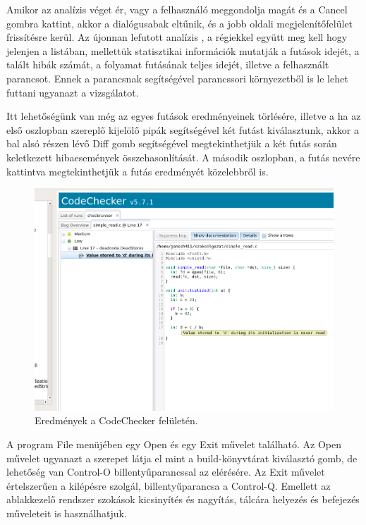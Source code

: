 \documentclass[a4paper,12pt]{report}
\begin{document}
Amikor az analízis véget ér, vagy a felhasználó meggondolja magát és a Cancel gombra kattint, akkor a dialógusabak eltűnik, és a jobb oldali megjelenítőfelület frissítésre kerül. Az újonnan lefutott analízis , a régiekkel együtt meg kell hogy jelenjen a listában, mellettük statisztikai információk mutatják a futások idejét, a talált hibák számát, a folyamat futásának teljes idejét, illetve a felhasznált parancsot. Ennek a parancsnak segítségével parancssori környezetből is le lehet futtani ugyanazt a vizsgálatot.

Itt lehetőségünk van még az egyes futások eredményeinek törlésére, illetve a ha az első oszlopban szereplő kijelölő pipák segítségével két futást kiválasztunk, akkor a bal alsó részen lévő Diff gomb segítségével megtekinthetjük a két futás során keletkezett hibaesemények összehasonlítását. A második oszlopban, a futás nevére kattintva megtekinthetjük a futás eredményét közelebbről is.

\begin{figure}[h]
\caption{Eredmények a CodeChecker felületén.}
\centering
\includegraphics[scale=0.4]{ui_results_open.png}
\end{figure}

A program File menüjében egy Open és egy Exit művelet található. Az Open művelet ugyanazt a szerepet látja el mint a build-könyvtárat kiválasztó gomb, de lehetőség van Control-O billentyűparancssal az elérésére. Az Exit művelet értelszerűen a kilépésre szolgál, billentyűparancsa a Control-Q. Emellett az ablakkezelő rendszer szokások kicsinyítés és nagyítás, tálcára helyezés és befejezés műveleteit is használhatjuk.
\end{document}
